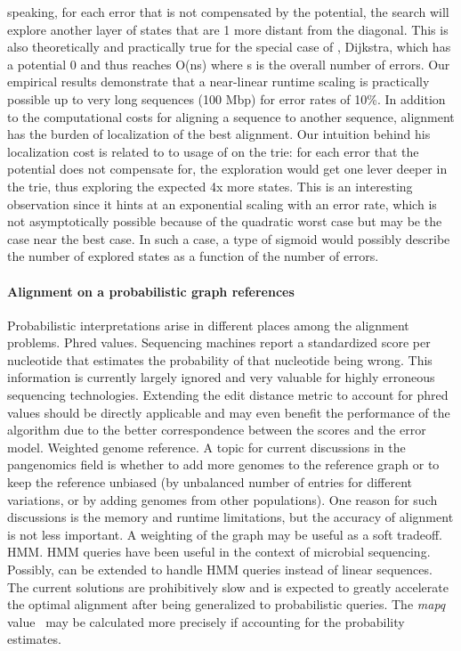 speaking, for each error that is not compensated by the potential, the \A search
will explore another layer of states that are 1 more distant from the diagonal.
This is also theoretically and practically true for the special case of \A,
Dijkstra, which has a potential 0 and thus reaches O(ns) where s is the overall
number of errors. Our empirical results demonstrate that a near-linear runtime
scaling is practically possible up to very long sequences (100 Mbp) for error
rates of 10\%. In addition to the computational costs for aligning a sequence to
another sequence, alignment has the burden of localization of the best
alignment. Our intuition behind his localization cost is related to to usage of
\A on the trie: for each error that the \A potential does not compensate for,
the exploration would get one lever deeper in the trie, thus exploring the
expected 4x more states. This is an interesting observation since it hints at an
exponential scaling with an error rate, which is not asymptotically possible
because of the quadratic worst case but may be the case near the best case. In
such a case, a type of sigmoid would possibly describe the number of explored
states as a function of the number of errors.

\paragraph{Alignment on a probabilistic graph references}
Probabilistic interpretations arise in different places among the alignment
problems. Phred values. Sequencing machines report a standardized score per
nucleotide that estimates the probability of that nucleotide being wrong. This
information is currently largely ignored and very valuable for highly erroneous
sequencing technologies. Extending the edit distance metric to account for phred
values should be directly applicable and may even benefit the performance of the
\A algorithm due to the better correspondence between the scores and the error
model. Weighted genome reference. A topic for current discussions in the
pangenomics field is whether to add more genomes to the reference graph or to
keep the reference unbiased (by unbalanced number of entries for different
variations, or by adding genomes from other populations). One reason for such
discussions is the memory and runtime limitations, but the accuracy of alignment
is not less important. A weighting of the graph may be useful as a soft
tradeoff. HMM. HMM queries have been useful in the context of microbial
sequencing. Possibly, \A can be extended to handle HMM queries instead of linear
sequences. The current solutions are prohibitively slow and \astarix is expected
to greatly accelerate the optimal alignment after being generalized to
probabilistic queries. The \textit{mapq} value~\citep{li2008mapping} may be calculated
more precisely if accounting for the probability estimates.

